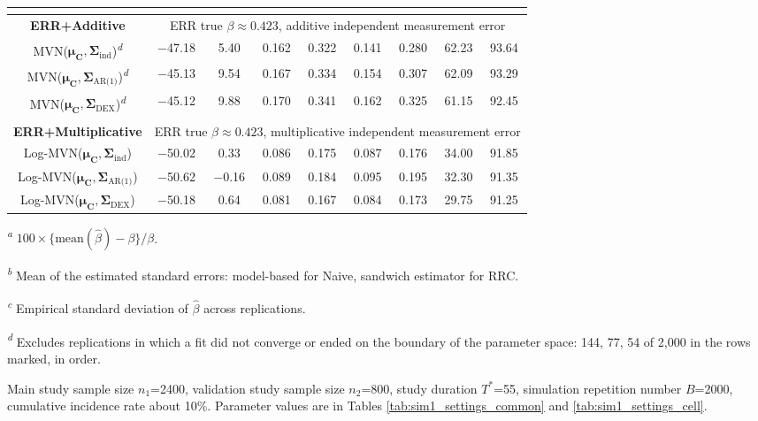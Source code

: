 \begin{table}[!htbp]
\begin{minipage}{\textwidth}
\begin{tabular}{|c|c|c|c|c|c|c|c|c|}
\hline
\multicolumn{9}{|c|}{}\\
\hline
\bf ERR+Additive & \multicolumn{8}{c|}{ERR true $\beta\approx 0.423$, additive independent measurement error} \\
\hline
MVN($\bm{\mu_C},\bm{\Sigma}_{\text{ind}}$)\textsuperscript{\textit{d}} & $-$47.18 & 5.40 & 0.162 & 0.322 & 0.141 & 0.280 & 62.23 & 93.64 \\
\hline
MVN($\bm{\mu_C},\bm{\Sigma}_{\text{AR(1)}}$)\textsuperscript{\textit{d}} & $-$45.13 & 9.54 & 0.167 & 0.334 & 0.154 & 0.307 & 62.09 & 93.29 \\
\hline
MVN($\bm{\mu_C},\bm{\Sigma}_{\text{DEX}}$)\textsuperscript{\textit{d}} & $-$45.12 & 9.88 & 0.170 & 0.341 & 0.162 & 0.325 & 61.15 & 92.45 \\
\hline
\multicolumn{9}{|c|}{}\\
\hline
\bf ERR+Multiplicative & \multicolumn{8}{c|}{ERR true $\beta\approx 0.423$, multiplicative independent measurement error} \\
\hline
Log-MVN($\bm{\mu_C},\bm{\Sigma}_{\text{ind}}$) & $-$50.02 & 0.33 & 0.086 & 0.175 & 0.087 & 0.176 & 34.00 & 91.85 \\
\hline
Log-MVN($\bm{\mu_C},\bm{\Sigma}_{\text{AR(1)}}$) & $-$50.62 & $-$0.16 & 0.089 & 0.184 & 0.095 & 0.195 & 32.30 & 91.35 \\
\hline
Log-MVN($\bm{\mu_C},\bm{\Sigma}_{\text{DEX}}$) & $-$50.18 & 0.64 & 0.081 & 0.167 & 0.084 & 0.173 & 29.75 & 91.25 \\
\hline
\end{tabular}
\par
{\raggedright\footnotesize
\begin{list}{}{\setlength{\leftmargin}{1.2em}\setlength{\labelwidth}{0.8em}\setlength{\labelsep}{0.4em}%
  \setlength{\itemsep}{0pt}\setlength{\parsep}{0pt}\setlength{\topsep}{4pt}\setlength{\partopsep}{0pt}}
\item[\textsuperscript{\textit{a}}] $100\times\{\text{mean}(\hat{\beta})-\beta\}/\beta$.
\item[\textsuperscript{\textit{b}}] Mean of the estimated standard errors: model-based for Naive, sandwich estimator for RRC.
\item[\textsuperscript{\textit{c}}] Empirical standard deviation of $\hat{\beta}$ across replications.
\item[\textsuperscript{\textit{d}}] Excludes replications in which a fit did not converge or ended on the boundary of the parameter space: 144, 77, 54 of 2,000 in the rows marked, in order.
\item[] Main study sample size $n_1$=2400, validation study sample size $n_2$=800, study duration $T^{*}$=55, simulation repetition number $B$=2000, cumulative incidence rate about 10\%. Parameter values are in Tables \ref{tab:sim1_settings_common} and \ref{tab:sim1_settings_cell}.
\end{list}
\par}
\end{minipage}
\label{tab:sim1}
\end{table}

